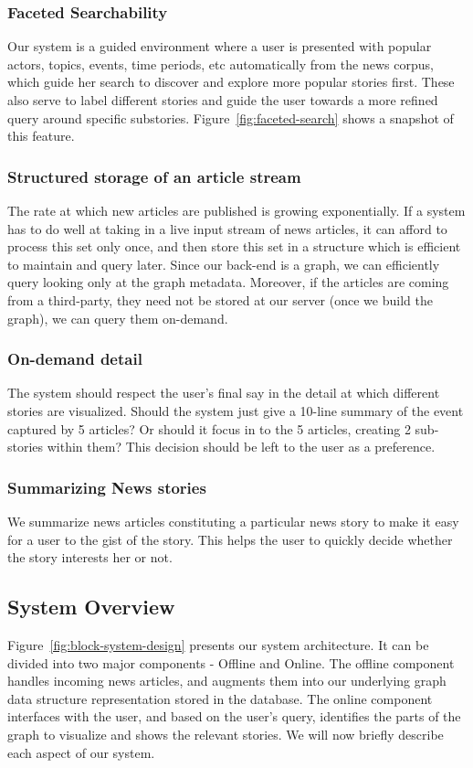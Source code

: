 \subsubsection{Faceted Searchability}
Our system is a guided environment where a user is presented with popular actors, topics, events, time periods, etc automatically from the 
news corpus, which guide her search to discover and explore more popular stories first. These also serve to label different stories and guide the
user towards a more refined query around specific substories. Figure~\ref{fig:faceted-search} shows a snapshot of this feature.

\subsubsection{Structured storage of an article stream}
The rate at which new articles are published is growing exponentially. If a system
has to do well at taking in a live input stream of news articles, it can afford to process this set only once, and then store this set in a structure
which is efficient to maintain and query later. Since our back-end is a graph, we can efficiently query looking only at the graph metadata. 
Moreover, if the articles are coming from a third-party, they need not be stored at our server (once we build the graph), we can query them on-demand. 

\subsubsection{On-demand detail}
The system should respect the user's final say in the detail at which different stories are visualized. Should the system
just give a 10-line summary of the event captured by 5 articles? Or should it focus in to the 5 articles, creating 2 sub-stories within them? This decision
should be left to the user as a preference.

\subsubsection{Summarizing News stories}
We summarize news articles constituting a particular news story to make it easy for a user to the gist of the story. This helps the user to quickly decide whether the story interests her or not.

\subsection{System Overview}
Figure~\ref{fig:block-system-design} presents our system architecture. It can be divided into
two major components - Offline and Online. The offline component handles incoming news articles, and augments them into our underlying graph data structure representation stored
in the database. The online component interfaces with the user, and based on the user's query, identifies the parts of the graph to visualize and 
shows the relevant stories. We will now briefly describe each aspect of our system.

